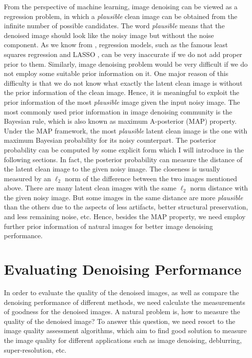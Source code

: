 From the perspective of machine learning, image denoising can be viewed as a regression problem, in which a \textsl{plausible} clean image can be obtained from the infinite number of possible candidates. The word \textsl{plausible} means that the denoised image should look like the noisy image but without the noise component. As we know from \cite{prml}, regression models, such as the famous least squares regression and LASSO \cite{lasso}, can be very inaccurate if we do not add proper prior to them. Similarly, image denoising problem would be very difficult if we do not employ some suitable prior information on it. One major reason of this difficulty is that we do not know what exactly the latent clean image is without the prior information of the clean image. Hence, it is meaningful to exploit the prior information of the most \textsl{plausible} image given the input noisy image. The most commonly used prior information in image denoising community is the Bayesian rule, which is also known as maximum A-posterior (MAP) property. Under the MAP framework, the most \textsl{plausible} latent clean image is the one with maximum Bayesian probability for its noisy counterpart. The posterior probability can be computed by some explicit form which I will introduce in the following sections. In fact, the posterior probability can measure the distance of the latent clean image to the given noisy image. The closeness is usually measured by an $\ell_{2}$ norm of the difference between the two images mentioned above. There are many latent clean images with the same $\ell_{2}$ norm distance with the given noisy image. But some images in the same distance are more \textsl{plausible} than the others due to the aspects of less artifacts, better structural preservation, and less remaining noise, etc. Hence, besides the MAP property, we need employ further prior information of natural images for better image denoising performance.

\section{Evaluating Denoising Performance}

In order to evaluate the quality of the denoised images, as well as compare the denoising performance of different methods, we need calculate the measurements of goodness for the denoised images. A natural problem is, how to measure the quality of the denoised image? To answer this question, we need resort to the image quality assessment algorithms, which aim to find good solution to measure the image quality for different applications such as image denoising, deblurring, super-resolution, etc. 

